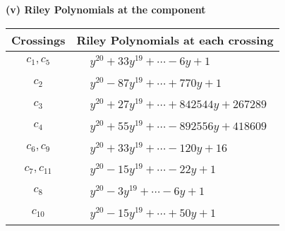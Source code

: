 \documentclass[1p]{elsarticle_modified}
\theoremstyle{definition}
\begin{document}
\newpage\renewcommand{\arraystretch}{1}
\flushleft \textbf{(v) Riley Polynomials at the component}\newline \\
\begin{tabular}{m{50pt}|m{274pt}}
Crossings & \hspace{64pt}Riley Polynomials at each crossing \\
\hline $$\begin{aligned}c_{1},c_{5}\end{aligned}$$&$\begin{aligned}
&y^{20}+33 y^{19}+\cdots-6 y+1
\end{aligned}$\\
\hline $$\begin{aligned}c_{2}\end{aligned}$$&$\begin{aligned}
&y^{20}-87 y^{19}+\cdots+770 y+1
\end{aligned}$\\
\hline $$\begin{aligned}c_{3}\end{aligned}$$&$\begin{aligned}
&y^{20}+27 y^{19}+\cdots+842544 y+267289
\end{aligned}$\\
\hline $$\begin{aligned}c_{4}\end{aligned}$$&$\begin{aligned}
&y^{20}+55 y^{19}+\cdots-892556 y+418609
\end{aligned}$\\
\hline $$\begin{aligned}c_{6},c_{9}\end{aligned}$$&$\begin{aligned}
&y^{20}+33 y^{19}+\cdots-120 y+16
\end{aligned}$\\
\hline $$\begin{aligned}c_{7},c_{11}\end{aligned}$$&$\begin{aligned}
&y^{20}-15 y^{19}+\cdots-22 y+1
\end{aligned}$\\
\hline $$\begin{aligned}c_{8}\end{aligned}$$&$\begin{aligned}
&y^{20}-3 y^{19}+\cdots-6 y+1
\end{aligned}$\\
\hline $$\begin{aligned}c_{10}\end{aligned}$$&$\begin{aligned}
&y^{20}-15 y^{19}+\cdots+50 y+1
\end{aligned}$\\
\hline
\end{tabular}\\~\\
\end{document}
